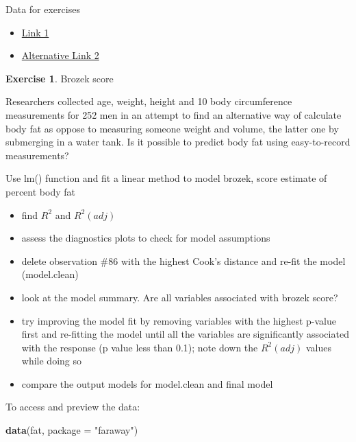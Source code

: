 \documentclass[
]{book}
\newenvironment{Shaded}{\begin{snugshade}}{\end{snugshade}}
\newcommand{\DataTypeTok}[1]{\textcolor[rgb]{0.13,0.29,0.53}{#1}}
\newcommand{\KeywordTok}[1]{\textcolor[rgb]{0.13,0.29,0.53}{\textbf{#1}}}
\newcommand{\NormalTok}[1]{#1}
\newcommand{\StringTok}[1]{\textcolor[rgb]{0.31,0.60,0.02}{#1}}
\providecommand{\tightlist}{%
  \setlength{\itemsep}{0pt}\setlength{\parskip}{0pt}}
\theoremstyle{definition}
\theoremstyle{definition}
\theoremstyle{definition}
\newtheorem{exercise}{Exercise}[chapter]
\theoremstyle{remark}
\begin{document}
Data for exercises

\begin{itemize}
\tightlist
\item
  \href{https://github.com/olgadet/bookdown-mlbiostatistics/tree/master/data/data.zip}{Link 1}
\item
  \href{https://stockholmuniversity.box.com/s/z5kwg0nlwe5la4h5t8bshpj57pylif14}{Alternative Link 2}
\end{itemize}

\begin{exercise}
\protect\hypertarget{exr:lm-brozek}{}{\label{exr:lm-brozek} }
Brozek score

Researchers collected age, weight, height and 10 body circumference measurements for 252 men in an attempt to find an alternative way of calculate body fat as oppose to measuring someone weight and volume, the latter one by submerging in a water tank. Is it possible to predict body fat using easy-to-record measurements?

Use lm() function and fit a linear method to model brozek, score estimate of percent body fat

\begin{itemize}
\tightlist
\item
  find \(R^2\) and \(R^2(adj)\)
\item
  assess the diagnostics plots to check for model assumptions
\item
  delete observation \#86 with the highest Cook's distance and re-fit the model (model.clean)
\item
  look at the model summary. Are all variables associated with brozek score?
\item
  try improving the model fit by removing variables with the highest p-value first and re-fitting the model until all the variables are significantly associated with the response (p value less than 0.1); note down the \(R^2(adj)\) values while doing so
\item
  compare the output models for model.clean and final model
\end{itemize}
\end{exercise}

To access and preview the data:

\begin{Shaded}
\begin{Highlighting}[]
\KeywordTok{data}\NormalTok{(fat, }\DataTypeTok{package =} \StringTok{"faraway"}\NormalTok{)}
\end{Highlighting}
\end{Shaded}
\end{document}

